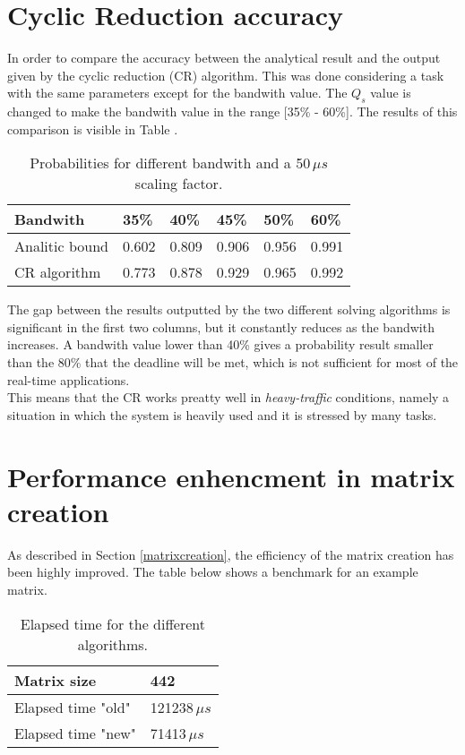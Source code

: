 \section{Cyclic Reduction accuracy} \label{craccuracy}
In order to compare the accuracy between the analytical result and the output given by the cyclic reduction (CR) algorithm. This was done considering a task with the same parameters except for the bandwith value. The \( Q_{s} \) value is changed to make the bandwith value in the range [35\% - 60\%]. The results of this comparison is visible in Table .
\begin{table}[H]
\label{comparison}
\begin{center}
\begin{tabular}{| l | l | l | l | l | l |}
  \hline
  Bandwith & 35\% & 40\% & 45\% & 50\% & 60\% \\ \hline
  Analitic bound & 0.602 & 0.809 & 0.906 & 0.956 & 0.991 \\
  CR algorithm & 0.773 & 0.878 & 0.929 & 0.965 & 0.992 \\ \hline
\end{tabular}
\caption[]{Probabilities for different bandwith and a 50\,\( \mu{s} \) scaling factor\footnotemark.}
\end{center} 
\end{table}

The gap between the results outputted by the two different solving algorithms is significant in the first two columns, but it constantly reduces as the bandwith increases. A bandwith value lower than 40\% gives a probability result smaller than the 80\% that the deadline will be met, which is not sufficient for most of the real-time applications.\\
This means that the CR works preatty well in \emph{heavy-traffic} conditions, namely a situation in which the system is heavily used and it is stressed by many tasks.

\section{Performance enhencment in matrix creation} \label{matrixperformance}
As described in Section \ref{matrixcreation}, the efficiency of the matrix creation has been highly improved. The table below shows a benchmark for an example matrix.
\begin{table}[H]
\label{benchmark}
\begin{center}
\begin{tabular}{| l | l |}
  \hline
  Matrix size & 442 \\ \hline
  Elapsed time "old" & 121238\( \,\mu{s} \) \\ \hline
  Elapsed time "new" & 71413\( \,\mu{s} \) \\ \hline
\end{tabular}
\caption[]{Elapsed time for the different algorithms\footnotemark.}
\end{center}
\end{table}

